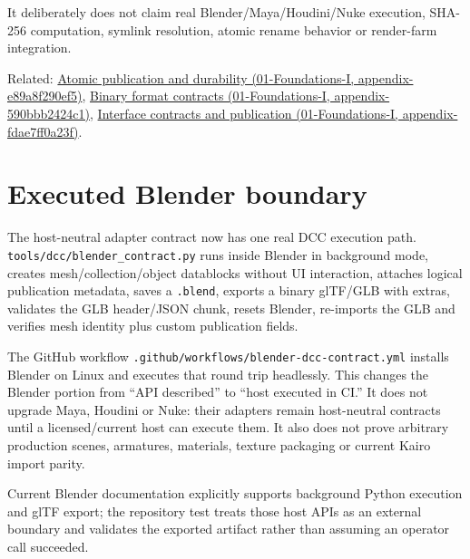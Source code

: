It deliberately does not claim real Blender/Maya/Houdini/Nuke execution, SHA-256 computation, symlink resolution, atomic rename behavior or render-farm integration.

Related: \href{../01-Foundations-I/main.pdf\#nameddest=appendix-e89a8f290ef5}{Atomic publication and durability (01-Foundations-I, appendix-e89a8f290ef5)}, \href{../01-Foundations-I/main.pdf\#nameddest=appendix-590bbb2424c1}{Binary format contracts (01-Foundations-I, appendix-590bbb2424c1)}, \href{../01-Foundations-I/main.pdf\#nameddest=appendix-fdae7ff0a23f}{Interface contracts and publication (01-Foundations-I, appendix-fdae7ff0a23f)}.

\section{Executed Blender boundary}\label{appendix-03ade9e1875f-executed-blender-boundary}

The host-neutral adapter contract now has one real DCC execution path. \texttt{tools/dcc/blender\_contract.py} runs inside Blender in background mode, creates mesh/collection/object datablocks without UI interaction, attaches logical publication metadata, saves a \texttt{.blend}, exports a binary glTF/GLB with extras, validates the GLB header/JSON chunk, resets Blender, re-imports the GLB and verifies mesh identity plus custom publication fields.

The GitHub workflow \texttt{.github/workflows/blender-dcc-contract.yml} installs Blender on Linux and executes that round trip headlessly. This changes the Blender portion from ``API described'' to ``host executed in CI.'' It does not upgrade Maya, Houdini or Nuke: their adapters remain host-neutral contracts until a licensed/current host can execute them. It also does not prove arbitrary production scenes, armatures, materials, texture packaging or current Kairo import parity.

Current Blender documentation explicitly supports background Python execution and glTF export; the repository test treats those host APIs as an external boundary and validates the exported artifact rather than assuming an operator call succeeded.
